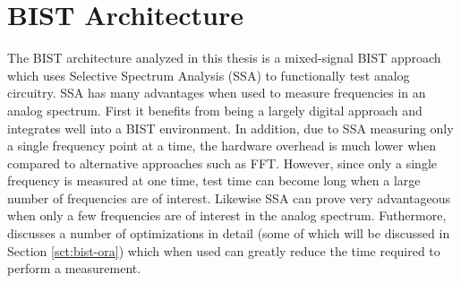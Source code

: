 \documentclass[12pt]{report}
\begin{document}
\section{BIST Architecture}
The BIST architecture analyzed in this thesis is a mixed-signal BIST approach which uses Selective Spectrum Analysis (SSA) to functionally test analog circuitry\cite{jie-journal}.  SSA has many advantages when used to measure frequencies in an analog spectrum.  First it benefits from being a largely digital approach and integrates well into a BIST environment.  In addition, due to SSA measuring only a single frequency point at a time, the hardware overhead is much lower when compared to alternative approaches such as FFT\cite{stroud-phase}. However, since only a single frequency is measured at one time, test time can become long when a large number of frequencies are of interest.  Likewise SSA can prove very advantageous when only a few frequencies are of interest in the analog spectrum\cite{jie-journal}.  Futhermore, \cite{jie} discusses a number of optimizations in detail (some of which will be discussed in Section \ref{sct:bist-ora}) which when used can greatly reduce the time required to perform a measurement.
\end{document}
